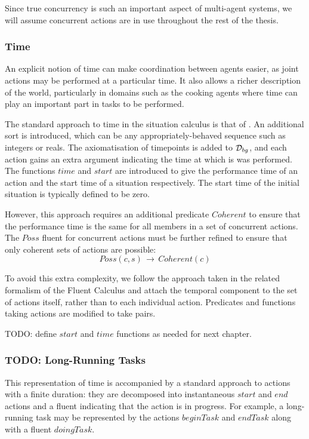 Since true concurrency is such an important aspect of multi-agent
systems, we will assume concurrent actions are in use throughout the
rest of the thesis.


\subsubsection{Time}

An explicit notion of time can make coordination between agents easier,
as joint actions may be performed at a particular time. It also allows
a richer description of the world, particularly in domains such as
the cooking agents where time can play an important part in tasks
to be performed.

The standard approach to time in the situation calculus is that of
\citep{pinto94temporal,reiter96sc_nat_conc}. An additional sort 
is introduced, which can be any appropriately-behaved sequence such
as integers or reals. The axiomatisation of timepoints is added to
$\mathcal{D}_{bg}$, and each action gains an extra argument indicating the
time at which is was performed. The functions $time$ and $start$
are introduced to give the performance time of an action and the start
time of a situation respectively. The start time of the initial situation
is typically defined to be zero.

However, this approach requires an additional predicate $Coherent$
to ensure that the performance time is the same for all members in
a set of concurrent actions. The $Poss$ fluent for concurrent actions
must be further refined to ensure that only coherent sets of actions
are possible:\[
Poss(c,s)\,\rightarrow\, Coherent(c)\]


To avoid this extra complexity, we follow the approach taken in the
related formalism of the Fluent Calculus \citep{martin03conc_flux}
and attach the temporal component to the set of actions itself, rather
than to each individual action. Predicates and functions taking actions
are modified to take pairs.

TODO: define $start$ and $time$ functions as needed for next chapter.


\subsubsection{TODO: Long-Running Tasks}

This representation of time is accompanied by a standard approach
to actions with a finite duration: they are decomposed into instantaneous
$start$ and $end$ actions and a fluent indicating that the action
is in progress. For example, a long-running task may be represented
by the actions $beginTask$ and $endTask$ along with a fluent $doingTask$.

